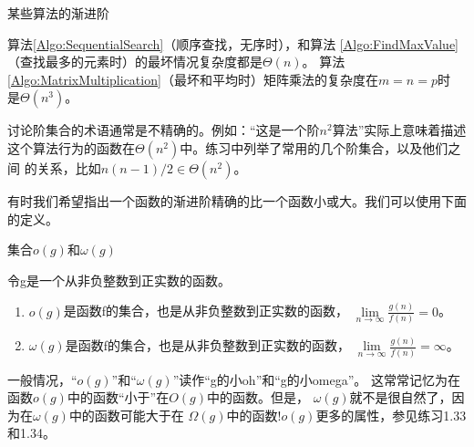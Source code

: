 \begin{example}
某些算法的渐进阶

算法\ref{Algo:SequentialSearch}（顺序查找，无序时），和算法
\ref{Algo:FindMaxValue}（查找最多的元素时）的最坏情况复杂度都是$\Theta(n)$。
算法\ref{Algo:MatrixMultiplication}（最坏和平均时）矩阵乘法的复杂度在$m=n=p$时
是$\Theta(n^3)$。
\end{example}

讨论阶集合的术语通常是不精确的。例如：“这是一个阶$n^2$算法”实际上意味着描述
这个算法行为的函数在$\Theta(n^2)$中。练习中列举了常用的几个阶集合，以及他们之间
的关系，比如$n(n-1)/2\in \Theta(n^2)$。

有时我们希望指出一个函数的渐进阶精确的比一个函数小或大。我们可以使用下面的定义。

\begin{definition}\label{Def:LittleoAndomega}
集合$o(g)$和$\omega(g)$

令g是一个从非负整数到正实数的函数。
\begin{enumerate}
\item $o(g)$是函数f的集合，也是从非负整数到正实数的函数，
$\lim\limits_{n\rightarrow \infty}\frac{g(n)}{f(n)}=0$。
\item $\omega(g)$是函数f的集合，也是从非负整数到正实数的函数，
$\lim\limits_{n\rightarrow \infty}\frac{g(n)}{f(n)}=\infty$。
\end{enumerate}
\end{definition}

一般情况，“$o(g)$”和“$\omega(g)$”读作“g的小oh”和“g的小omega”。
这常常记忆为在函数$o(g)$中的函数“小于”在$O(g)$中的函数。但是，
$\omega(g)$就不是很自然了，因为在$\omega(g)$中的函数可能大于在
$\Omega(g)$中的函数!$o(g)$更多的属性，参见练习1.33和1.34。


